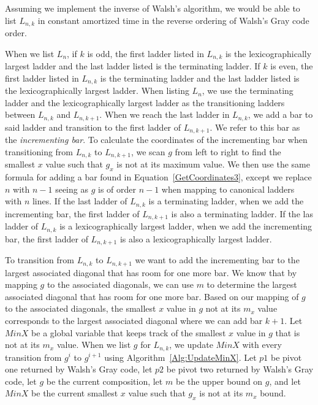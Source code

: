 Assuming we implement the inverse of Walsh's algorithm, we would be able to list $L_{n,k}$  in constant amortized time in 
the reverse ordering of Walsh's Gray code order.\par
When we list $L_{n}$, if $k$ is odd, the first ladder listed in $L_{n,k}$ is the lexicographically 
largest ladder and the last ladder listed is the terminating ladder. If $k$ is even, 
the first ladder listed in $L_{n,k}$ is the terminating ladder and the last ladder listed is the lexicographically largest ladder.
When listing $L_{n}$, we use the terminating ladder and the lexicographically largest ladder as the transitioning 
ladders between $L_{n,k}$ and $L_{n,k+1}$. When we reach the last ladder in $L_{n,k}$, we add a bar 
to said ladder and transition to the first ladder of $L_{n, k+1}$. We refer to this bar as the \emph{incrementing bar}. 
To calculate the coordinates of the incrementing bar when transitioning 
from $L_{n,k}$ to $L_{n,k+1}$, we scan $g$ from left to right to find the smallest $x$ 
value such that $g_{x}$ is not at its maximum value. We then use the same formula for adding a bar found in Equation~\ref{GetCoordinates3}, 
except we replace $n$ with $n-1$ seeing as $g$ is of order $n-1$ when mapping to canonical ladders with $n$ lines. If the last ladder 
of $L_{n,k}$ is a terminating ladder, when we add the incrementing bar, the first ladder of $L_{n,k+1}$ is also a terminating ladder. If the 
las ladder of $L_{n,k}$ is a lexicographically largest ladder, when we add the incrementing bar, the first ladder of $L_{n,k+1}$ is also a 
lexicographically largest ladder.\par 
To transition from $L_{n, k}$ to $L_{n, k+1}$ we want to add the incrementing bar to the 
largest associated diagonal that has room for one more bar. We know that by mapping 
$g$ to the associated diagonals, we can use $m$ to determine the largest associated diagonal that has room for one more bar. 
Based on our mapping of $g$ to the associated diagonals, the smallest $x$ value in $g$ not at its $m_{x}$ value corresponds to the largest 
associated diagonal where we can add bar $k+1$. 
Let $MinX$ be a global variable that keeps track of the smallest $x$ value in $g$ that is not at its 
$m_{x}$ value. When we list $g$ for $L_{n,k}$, we update $MinX$ with every transition from $g^{i}$ to $g^{i+1}$ using Algorithm~\ref{Alg:UpdateMinX}.
Let $p1$ be pivot one returned by Walsh's Gray code, let $p2$ be pivot two returned by Walsh's Gray code, let $g$ be the current composition, 
 let $m$ be the upper bound on $g$, and let $MinX$ be the current smallest $x$ value such that $g_{x}$ is not at its $m_{x}$ bound.\pagebreak
